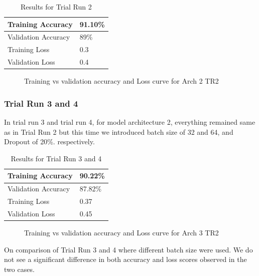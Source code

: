\documentclass{article}
\begin{document}
\begin{table}[h]
\centering
\caption{Results for Trial Run 2}
\begin{tabular}{|l|l|}
\hline
Training Accuracy   & 91.10\% \\ \hline
Validation Accuracy & 89\% \\ \hline
Training Loss        & 0.3    \\ \hline
Validation Loss     & 0.4    \\ \hline
\end{tabular}
\end{table}

\begin{figure}[H]
    \centering
    \qquad
    \caption{Training vs validation accuracy and Loss curve for Arch 2 TR2}%
    \label{fig:Arch2_Tr2}%
\end{figure}

\subsubsection{Trial Run 3 and 4}
In trial run 3 and trial run 4, for model architecture 2, everything remained same as in Trial Run 2 but this time we introduced batch size of 32 and 64, and Dropout of 20\%. respectively.

\begin{table}[h]
\centering
\caption{Results for Trial Run 3 and 4}
\begin{tabular}{|l|l|}
\hline
Training Accuracy   & 90.22\% \\ \hline
Validation Accuracy & 87.82\% \\ \hline
Training Loss        & 0.37    \\ \hline
Validation Loss     & 0.45    \\ \hline
\end{tabular}
\end{table}

\begin{figure}[H]
  \centering
    \qquad
    \caption{Training vs validation accuracy and Loss curve for Arch 3 TR2}%
    \label{fig:Arch2_Tr3}%
\end{figure}
On comparison of Trial Run 3 and 4 where different batch size were used. We do not see a significant difference in both accuracy and loss scores observed in the two cases.
\end{document}
